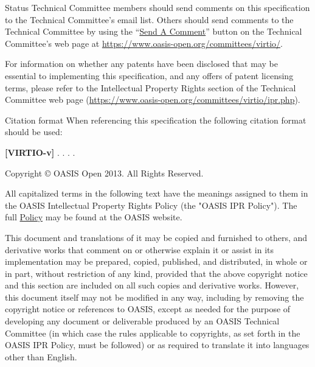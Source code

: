 \begin{titlepage}
\begin{oasistitlesection}{Status}
Technical Committee members should send comments on this
specification to the Technical Committee’s email list. Others
should send comments to the Technical Committee by using the
``\href{https://www.oasis-open.org/committees/comments/form.php?wg_abbrev=virtio}{Send
A Comment}'' button on the Technical Committee’s web page at
\url{https://www.oasis-open.org/committees/virtio/}.

For information on whether any patents have been disclosed that
may be essential to implementing this specification, and any
offers of patent licensing terms, please refer to the
Intellectual Property Rights section of the Technical Committee
web page (\url{https://www.oasis-open.org/committees/virtio/ipr.php}).
\end{oasistitlesection}


\begin{oasistitlesection}{Citation format}
When referencing this specification the following citation format should be used:\newline

\textbf{[VIRTIO-v\virtiorev]}\newline
\textit{\virtioversion}. \virtioworkingdraftdate.
\virtiodraftoasisstagename \virtiodraftstageextra . \virtiourlhtml .
\end{oasistitlesection}

\vfill\newpage


Copyright © OASIS Open 2013. All Rights Reserved.

All capitalized terms in the following text have the meanings assigned
to them in the OASIS Intellectual Property Rights Policy (the "OASIS
IPR Policy"). The full \href{https://www.oasis-open.org/policies-guidelines/ipr}{Policy} may be found at the OASIS website.

This document and translations of it may be copied and furnished to
others, and derivative works that comment on or otherwise explain it
or assist in its implementation may be prepared, copied, published,
and distributed, in whole or in part, without restriction of any kind,
provided that the above copyright notice and this section are included
on all such copies and derivative works. However, this document itself
may not be modified in any way, including by removing the copyright
notice or references to OASIS, except as needed for the purpose of
developing any document or deliverable produced by an OASIS Technical
Committee (in which case the rules applicable to copyrights, as set
forth in the OASIS IPR Policy, must be followed) or as required to
translate it into languages other than English.


\end{titlepage}
